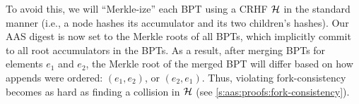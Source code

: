 To avoid this, we will ``Merkle-ize'' each BPT using a CRHF $\mathcal{H}$ in the standard manner (i.e., a node hashes its accumulator and its two children's hashes).
Our AAS digest is now set to the Merkle roots of all BPTs, which implicitly commit to all root accumulators in the BPTs.
As a result, after merging BPTs for elements $e_1$ and $e_2$, the Merkle root of the merged BPT will differ based on how appends were ordered: $(e_1,e_2)$, or $(e_2,e_1)$.
Thus, violating fork-consistency becomes as hard as finding a collision in $\mathcal{H}$ (see \cref{s:aas:proofs:fork-consistency}).
